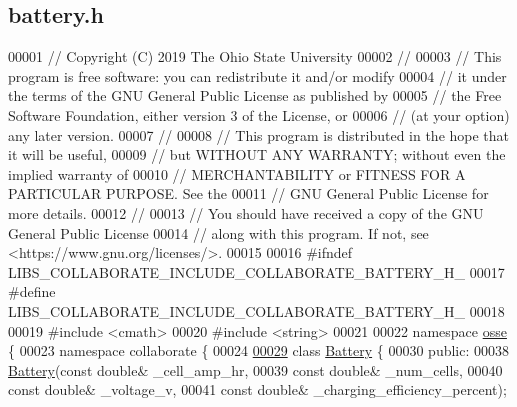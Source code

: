 \hypertarget{battery_8h_source}{}\subsection{battery.\+h}
\label{battery_8h_source}

\begin{DoxyCode}
00001 \textcolor{comment}{// Copyright (C) 2019 The Ohio State University}
00002 \textcolor{comment}{//}
00003 \textcolor{comment}{// This program is free software: you can redistribute it and/or modify}
00004 \textcolor{comment}{// it under the terms of the GNU General Public License as published by}
00005 \textcolor{comment}{// the Free Software Foundation, either version 3 of the License, or}
00006 \textcolor{comment}{// (at your option) any later version.}
00007 \textcolor{comment}{//}
00008 \textcolor{comment}{// This program is distributed in the hope that it will be useful,}
00009 \textcolor{comment}{// but WITHOUT ANY WARRANTY; without even the implied warranty of}
00010 \textcolor{comment}{// MERCHANTABILITY or FITNESS FOR A PARTICULAR PURPOSE.  See the}
00011 \textcolor{comment}{// GNU General Public License for more details.}
00012 \textcolor{comment}{//}
00013 \textcolor{comment}{// You should have received a copy of the GNU General Public License}
00014 \textcolor{comment}{// along with this program.  If not, see <https://www.gnu.org/licenses/>.}
00015 
00016 \textcolor{preprocessor}{#ifndef LIBS\_COLLABORATE\_INCLUDE\_COLLABORATE\_BATTERY\_H\_}
00017 \textcolor{preprocessor}{#define LIBS\_COLLABORATE\_INCLUDE\_COLLABORATE\_BATTERY\_H\_}
00018 
00019 \textcolor{preprocessor}{#include <cmath>}
00020 \textcolor{preprocessor}{#include <string>}
00021 
00022 \textcolor{keyword}{namespace }\hyperlink{namespaceosse}{osse} \{
00023 \textcolor{keyword}{namespace }collaborate \{
00024 
\hyperlink{classosse_1_1collaborate_1_1_battery}{00029} \textcolor{keyword}{class }\hyperlink{classosse_1_1collaborate_1_1_battery}{Battery} \{
00030  \textcolor{keyword}{public}:
00038   \hyperlink{classosse_1_1collaborate_1_1_battery_aa7cf9b637b12ead425d0643e325e3b85}{Battery}(\textcolor{keyword}{const} \textcolor{keywordtype}{double}& \_cell\_amp\_hr,
00039           \textcolor{keyword}{const} \textcolor{keywordtype}{double}& \_num\_cells,
00040           \textcolor{keyword}{const} \textcolor{keywordtype}{double}& \_voltage\_v,
00041           \textcolor{keyword}{const} \textcolor{keywordtype}{double}& \_charging\_efficiency\_percent);

\end{DoxyCode}
